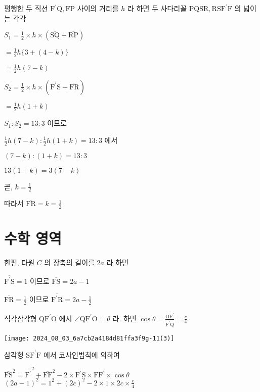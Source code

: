 \documentclass[10pt]{article}
\begin{document}
평행한 두 직선 \(\mathrm{F}^{\prime} \mathrm{Q}, \mathrm{FP}\) 사이의 거리를 \(h\) 라 하면 두 사다리꼴 \(\mathrm{PQSR}, \mathrm{RSF}^{\prime} \mathrm{F}\) 의 넓이는 각각

\(S_{1}=\frac{1}{2} \times h \times(\overline{\mathrm{SQ}}+\overline{\mathrm{RP}})\)

\(=\frac{1}{2} h\{3+(4-k)\}\)

\(=\frac{1}{2} h(7-k)\)

\(S_{2}=\frac{1}{2} \times h \times\left(\overline{\mathrm{F}^{\prime} \mathrm{S}}+\overline{\mathrm{FR}}\right)\)

\(=\frac{1}{2} h(1+k)\)

\(S_{1}: S_{2}=13: 3\) 이므로

\(\frac{1}{2} h(7-k): \frac{1}{2} h(1+k)=13: 3\) 에서

\((7-k):(1+k)=13: 3\)

\(13(1+k)=3(7-k)\)

곧, \(k=\frac{1}{2}\)

따라서 \(\overline{\mathrm{FR}}=k=\frac{1}{2}\)

\section*{수학 영역}
한편, 타원 \(C\) 의 장축의 길이를 \(2 a\) 라 하면

\(\overline{\mathrm{F}^{\prime} \mathrm{S}}=1\) 이므로 \(\overline{\mathrm{FS}}=2 a-1\)

\(\overline{\mathrm{FR}}=\frac{1}{2}\) 이므로 \(\overline{\mathrm{F}^{\prime} \mathrm{R}}=2 a-\frac{1}{2}\)

직각삼각형 \(\mathrm{QF}^{\prime} \mathrm{O}\) 에서 \(\angle \mathrm{QF}^{\prime} \mathrm{O}=\theta\) 라. 하면 \(\cos \theta=\frac{\overline{\mathrm{OF}^{\prime}}}{\overline{\mathrm{F}^{\prime} \mathrm{Q}}}=\frac{c}{4}\)

\begin{center}
\texttt{[image: 2024\_08\_03\_6a7cb2a4184d81ffa3f9g-11(3)]}
\end{center}

삼각형 \(\mathrm{SF}^{\prime} \mathrm{F}\) 에서 코사인법칙에 의하여

\(\overline{\mathrm{FS}}^{2}={\overline{\mathrm{F}^{\prime}}}^{2}+\overline{\mathrm{FF}}^{2}-2 \times \overline{\mathrm{F}^{\prime} \mathrm{S}} \times \overline{\mathrm{FF}^{\prime}} \times \cos \theta\) \((2 a-1)^{2}=1^{2}+(2 c)^{2}-2 \times 1 \times 2 c \times \frac{c}{4}\)
\end{document}

